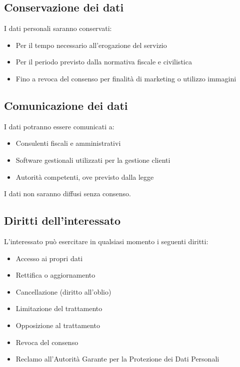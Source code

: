 \subsection*{Conservazione dei dati}

I dati personali saranno conservati:

\begin{itemize}
	\item Per il tempo necessario all'erogazione del servizio
	\item Per il periodo previsto dalla normativa fiscale e civilistica
	\item Fino a revoca del consenso per finalità di marketing o utilizzo immagini
\end{itemize}

\subsection*{Comunicazione dei dati}

I dati potranno essere comunicati a:

\begin{itemize}
	\item Consulenti fiscali e amministrativi
	\item Software gestionali utilizzati per la gestione clienti
	\item Autorità competenti, ove previsto dalla legge
\end{itemize}

I dati non saranno diffusi senza consenso.

\subsection*{Diritti dell'interessato}

L'interessato può esercitare in qualsiasi momento i seguenti diritti:

\begin{itemize}
	\item Accesso ai propri dati
	\item Rettifica o aggiornamento
	\item Cancellazione (diritto all'oblio)
	\item Limitazione del trattamento
	\item Opposizione al trattamento
	\item Revoca del consenso
	\item Reclamo all'Autorità Garante per la Protezione dei Dati Personali
\end{itemize}

